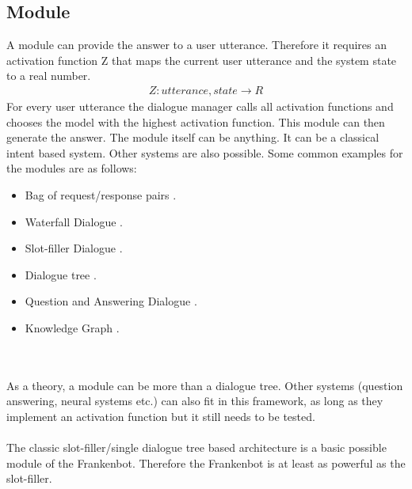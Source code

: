 \subsection{Module}
A module can provide the answer to a user utterance. Therefore it requires an activation function Z that maps the current user utterance and the system state to a real number.
\begin{align*}
 Z: utterance, state \rightarrow R
\end{align*} 
For every user utterance the dialogue manager calls all activation functions and chooses the model with the highest activation function. This module can then generate the answer. The module itself can be anything. It can be a classical intent based system. Other systems are also possible. Some common examples for the modules are as follows:
\begin{itemize}
\item Bag of request/response pairs \cite{rrpairs}.
\item Waterfall Dialogue \cite{waterfallDial}.       
\item Slot-filler Dialogue \cite{slotfillerDial}.
\item Dialogue tree \cite{dialogTree}.
\item Question and Answering Dialogue \cite{q&aDialog}.
\item Knowledge Graph \cite{knowlGraph}.
\end{itemize}
\\~\\
As a theory, a module can be more than a dialogue tree. Other systems (question answering, neural systems etc.) can also fit in this framework, as long as they implement an activation function but it still needs to be tested. 
\\~\\
The classic slot-filler/single dialogue tree based architecture is a basic possible module of the Frankenbot. Therefore the Frankenbot is at least as powerful as the slot-filler.

